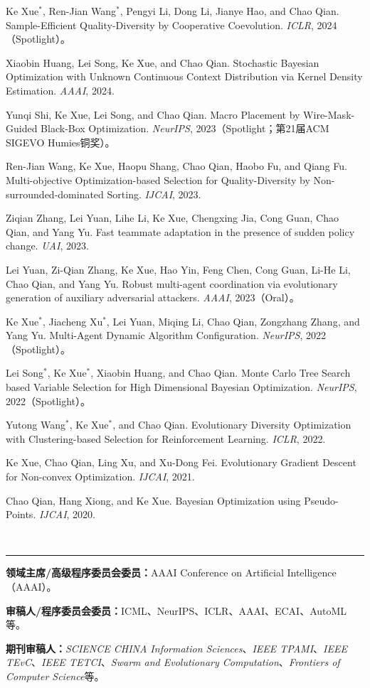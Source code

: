 \documentclass[10pt,a4paper,fontset=fandol]{ctexart}
\newcommand{\cvsection}[1]{%
  \vspace{0.65em}%
  \noindent{\heiti\large #1}\\[-0.15em]
  \rule{\textwidth}{0.4pt}%
  \vspace{0.4em}%
}
\begin{document}
\begin{cvbullet}
  \item Ke Xue$^*$, Ren-Jian Wang$^*$, Pengyi Li, Dong Li, Jianye Hao, and Chao Qian. Sample-Efficient Quality-Diversity by Cooperative Coevolution. \textit{ICLR}, 2024（Spotlight）。
  \item Xiaobin Huang, Lei Song, Ke Xue, and Chao Qian. Stochastic Bayesian Optimization with Unknown Continuous Context Distribution via Kernel Density Estimation. \textit{AAAI}, 2024.
  \item Yunqi Shi, Ke Xue, Lei Song, and Chao Qian. Macro Placement by Wire-Mask-Guided Black-Box Optimization. \textit{NeurIPS}, 2023（Spotlight；第21届ACM SIGEVO Humies铜奖）。
  \item Ren-Jian Wang, Ke Xue, Haopu Shang, Chao Qian, Haobo Fu, and Qiang Fu. Multi-objective Optimization-based Selection for Quality-Diversity by Non-surrounded-dominated Sorting. \textit{IJCAI}, 2023.
  \item Ziqian Zhang, Lei Yuan, Lihe Li, Ke Xue, Chengxing Jia, Cong Guan, Chao Qian, and Yang Yu. Fast teammate adaptation in the presence of sudden policy change. \textit{UAI}, 2023.
  \item Lei Yuan, Zi-Qian Zhang, Ke Xue, Hao Yin, Feng Chen, Cong Guan, Li-He Li, Chao Qian, and Yang Yu. Robust multi-agent coordination via evolutionary generation of auxiliary adversarial attackers. \textit{AAAI}, 2023（Oral）。
  \item Ke Xue$^*$, Jiacheng Xu$^*$, Lei Yuan, Miqing Li, Chao Qian, Zongzhang Zhang, and Yang Yu. Multi-Agent Dynamic Algorithm Configuration. \textit{NeurIPS}, 2022（Spotlight）。
  \item Lei Song$^*$, Ke Xue$^*$, Xiaobin Huang, and Chao Qian. Monte Carlo Tree Search based Variable Selection for High Dimensional Bayesian Optimization. \textit{NeurIPS}, 2022（Spotlight）。
  \item Yutong Wang$^*$, Ke Xue$^*$, and Chao Qian. Evolutionary Diversity Optimization with Clustering-based Selection for Reinforcement Learning. \textit{ICLR}, 2022.
  \item Ke Xue, Chao Qian, Ling Xu, and Xu-Dong Fei. Evolutionary Gradient Descent for Non-convex Optimization. \textit{IJCAI}, 2021.
  \item Chao Qian, Hang Xiong, and Ke Xue. Bayesian Optimization using Pseudo-Points. \textit{IJCAI}, 2020.
\end{cvbullet}

\cvsection{学术服务}
\begin{cvbullet}
  \item \textbf{领域主席/高级程序委员会委员：}AAAI Conference on Artificial Intelligence（AAAI）。
  \item \textbf{审稿人/程序委员会委员：}ICML、NeurIPS、ICLR、AAAI、ECAI、AutoML等。
  \item \textbf{期刊审稿人：}\textit{SCIENCE CHINA Information Sciences}、\textit{IEEE TPAMI}、\textit{IEEE TEvC}、\textit{IEEE TETCI}、\textit{Swarm and Evolutionary Computation}、\textit{Frontiers of Computer Science}等。
\end{cvbullet}
\end{document}
